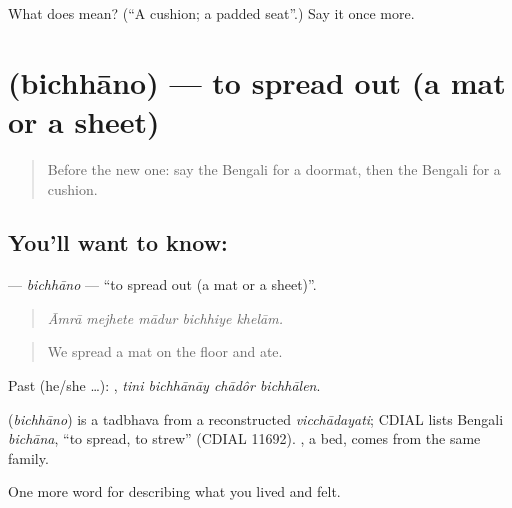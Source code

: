 \begin{tcolorbox}[breakable,colback=teal!4,colframe=teal!35!black,title={Before you move on}]
What does  mean? (\textquotedblleft{}A cushion; a padded seat\textquotedblright{}.) Say it once more.
\end{tcolorbox}
\section[\texorpdfstring{\bn{বিছানো} (bichhāno)}{বিছানো (bichhāno)}]{ (bichhāno) — to spread out (a mat or a sheet)}

\label{lesson:BN-C509-bichhano}



\begin{quote}
Before the new one: say the Bengali for a doormat, then the Bengali for a cushion.
\end{quote}

\subsection*{You'll want to know: }
\textbf{} — \emph{bichhāno} — \textquotedblleft{}to spread out (a mat or a sheet)\textquotedblright{}.

\begin{quote}
    
\end{quote}

\begin{quote}
\emph{Āmrā mejhete mādur bichhiye khelām.}
\end{quote}

\begin{quote}
We spread a mat on the floor and ate.
\end{quote}

Past (he/she …):    , \emph{tini bichhānāy chādôr bichhālen}.

\begin{cousinweb}
\textbf{} (\emph{bichhāno}) is a tadbhava from a reconstructed \emph{vicchādayati}; CDIAL lists Bengali \emph{bichāna}, \textquotedblleft{}to spread, to strew\textquotedblright{} (CDIAL 11692). , a bed, comes from the same family.
\end{cousinweb}

\begin{grammarlens}[title={What you've built}]
One more word for describing what you lived and felt.
\end{grammarlens}


